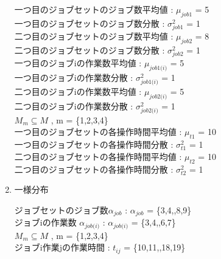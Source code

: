 \documentclass[twocolumn]{jarticle}
\begin{document}
\begin{enumerate}
    一つ目のジョブセットのジョブ数平均値 : $\mu_{\textit{job1}}$ = 5\\
    一つ目のジョブセットのジョブ数分散 : $\sigma^2_{\textit{job1}}$ = 1\\
    二つ目のジョブセットのジョブ数平均値 : $\mu_{\textit{job2}}$ = 8\\    二つ目のジョブセットのジョブ数分散 : $\sigma^2_{\textit{job2}}$ = 1\\
    一つ目のジョブiの作業数平均値 : $\mu_\textit{job1(i)}$ = 5\\
    一つ目のジョブiの作業数分散 : $\sigma^2_\textit{job1(i)}$ = 1\\
    二つ目のジョブiの作業数平均値 : $\mu_\textit{job2(i)}$ = 5\\
    二つ目のジョブiの作業数分散 : $\sigma^2_\textit{job2(i)}$ = 1\\
    $\textit{M}_{\textit{m}} \subseteq \textit{M}$ , m = \{1,2,3,4\}\\
    一つ目のジョブセットの各操作時間平均値 : $\mu_{\textit{t1}}$ = 10\\
    一つ目のジョブセットの各操作時間分散 : $\sigma^2_{\textit{t1}}$ = 1\\
    二つ目のジョブセットの各操作時間平均値 : $\mu_{\textit{t2}}$ = 10\\
    二つ目のジョブセットの各操作時間分散 : $\sigma^2_{\textit{t2}}$ = 1\\

    \item 一様分布
    
    ジョブセットのジョブ数$\alpha_{\textit{job}}$ : $\alpha_{\textit{job}}$ =  \{3,4,\textellipsis,8,9\}\\
    ジョブiの作業数 $\alpha_{\textit{job(i)}}$ : $\alpha_{\textit{job(i)}}$ = \{3,4,\textellipsis,6,7\}\\
    $\textit{M}_{\textit{m}} \subseteq \textit{M}$ , m = \{1,2,3,4\}\\
    ジョブi作業jの作業時間 : $t_{\textit{ij}}$ = \{10,11,\textellipsis,18,19\}\\
    
    \end{enumerate}
\end{document}
